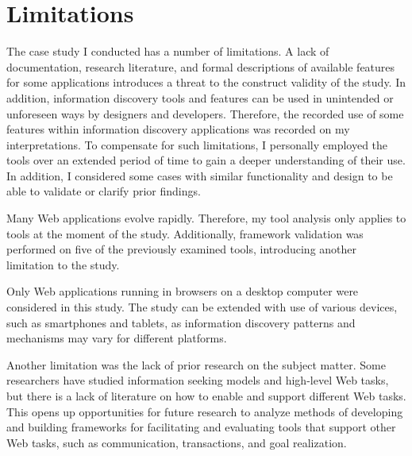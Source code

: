 {\section{Limitations}
The case study I conducted has a number of limitations. A lack of documentation, research literature, and formal descriptions of available features for some applications introduces a threat to the construct validity of the study. In addition, information discovery tools and features can be used in unintended or unforeseen ways by designers and developers. Therefore, the recorded use of some features within information discovery applications was recorded on my interpretations. To compensate for such limitations, I personally employed the tools over an extended period of time to gain a deeper understanding of their use. In addition, I considered some cases with similar functionality and design to be able to validate or clarify prior findings. 

Many Web applications evolve rapidly. Therefore, my tool analysis only applies to tools at the moment of the study. Additionally, framework validation was performed on five of the previously examined tools, introducing another limitation to the study. 
\pagebreak

Only Web applications running in browsers on a desktop computer were considered in this study. The study can be extended with use of various devices, such as smartphones and tablets, as information discovery patterns and mechanisms may vary for different platforms. 

Another limitation was the lack of prior research on the subject matter. Some researchers have studied information seeking models and high-level Web tasks, but there is a lack of literature on how to enable and support different Web tasks. This opens up opportunities for future research to analyze methods of developing and building frameworks for facilitating and evaluating tools that support other Web tasks, such as communication, transactions, and goal realization.


} %

